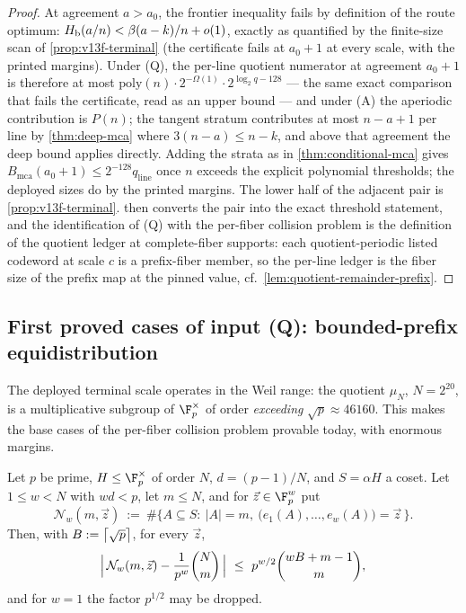 \begin{proof}
At agreement $a>a_0$, the frontier inequality fails by definition of the route optimum: $H_{\mathrm b}(a/n)<\beta(a-k)/n+o(1)$, exactly as quantified by the finite-size scan of \cref{prop:v13f-terminal} \textup(the certificate fails at $a_0+1$ at every scale, with the printed margins\textup).  Under \textup{(Q)}, the per-line quotient numerator at agreement $a_0+1$ is therefore at most $\mathrm{poly}(n)\cdot2^{-\Omega(1)}\cdot2^{\log_2 q-128}$ --- the same exact comparison that fails the certificate, read as an upper bound --- and under \textup{(A)} the aperiodic contribution is $P(n)$; the tangent stratum contributes at most $n-a+1$ per line by \cref{thm:deep-mca} where $3(n-a)\le n-k$, and above that agreement the deep bound applies directly.  Adding the strata as in \cref{thm:conditional-mca} gives $B_{\mathrm{mca}}(a_0+1)\le2^{-128}q_{\mathrm{line}}$ once $n$ exceeds the explicit polynomial thresholds; the deployed sizes do by the printed margins.  The lower half of the adjacent pair is \cref{prop:v13f-terminal}.   then converts the pair into the exact threshold statement, and the identification of \textup{(Q)} with the per-fiber collision problem is the definition of the quotient ledger at complete-fiber supports: each quotient-periodic listed codeword at scale $c$ is a prefix-fiber member, so the per-line ledger is the fiber size of the prefix map at the pinned value, cf.\ \cref{lem:quotient-remainder-prefix}.
\end{proof}

\subsection{First proved cases of input \textup{(Q)}: bounded-prefix equidistribution}

The deployed terminal scale operates in the Weil range: the quotient $\mu_N$, $N=2^{20}$, is a multiplicative subgroup of $\F_p^\times$ of order \emph{exceeding} $\sqrt p\approx46160$.  This makes the base cases of the per-fiber collision problem provable today, with enormous margins.

\begin{theorem}\label{thm:v13f-collision-base}
Let $p$ be prime, $H\le\F_p^\times$ of order $N$, $d=(p-1)/N$, and $S=\alpha H$ a coset.  Let $1\le w<N$ with $wd<p$, let $m\le N$, and for $\vec z\in\F_p^w$ put
\[
        \mathcal N_w(m,\vec z)\ :=\ \#\bigl\{A\subseteq S:\ |A|=m,\ \bigl(e_1(A),\ldots,e_w(A)\bigr)=\vec z\,\bigr\}.
\]
Then, with $B:=\left\lceil \sqrt p\right\rceil$, for every $\vec z$,
\[
        \Bigl|\,\mathcal N_w(m,\vec z)-\frac1{p^w}\binom Nm\,\Bigr|
        \ \le\ p^{w/2}\binom{wB+m-1}{m},
\]
and for $w=1$ the factor $p^{1/2}$ may be dropped.
\end{theorem}


